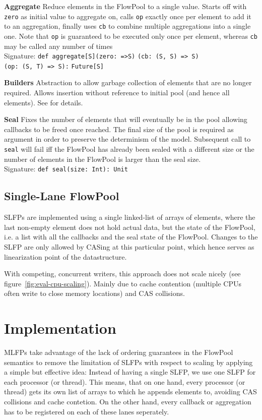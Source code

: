 \documentclass[runningheads,a4paper,fleqn]{llncs}
\begin{document}
\textbf{Aggregate} Reduce elements in the FlowPool to a single
value. Starts off with \verb+zero+ as initial value to aggregate on,
calls \verb+op+ exactly once per element to add it to an aggregation,
finally uses \verb+cb+ to combine multiple aggregations into a single
one. Note that \verb+op+ is guaranteed to be executed only once per
element, whereas \verb+cb+ may be called any number of times\\
Signature: \verb+def aggregate[S]+\verb+(zero: =>S)+
\verb+(cb: (S, S) => S)+\\
\verb+(op: (S, T) => S):+ \verb+Future[S]+

\textbf{Builders} Abstraction to allow garbage collection of elements
that are no longer required. Allows insertion without reference to
initial pool (and hence all elements). See \cite{FP12} for details.

\textbf{Seal} Fixes the number of elements that will eventually be in
the pool allowing callbacks to be freed once reached. The final size
of the pool is required as argument in order to preserve the
determinism of the model. Subsequent call to \verb+seal+ will fail iff
the FlowPool has already been sealed with a different size or the
number of elements in the FlowPool is larger than the seal size.\\
Signature: \verb+def seal(size: Int): Unit+

\subsection{Single-Lane FlowPool}
SLFPs are implemented using a single linked-list of arrays of
elements, where the last non-empty element does not hold actual data,
but the state of the FlowPool, i.e. a list with all the callbacks and
the seal state of the FlowPool. Changes to the SLFP are only allowed
by CASing at this particular point, which hence serves as
linearization point of the datastructure.

With competing, concurrent writers, this approach does not scale
nicely (see figure~\ref{fig:eval-cpu-scaling}). Mainly due to cache
contention (multiple CPUs often write to close memory locations) and
CAS collisions.

\section{Implementation}
MLFPs take advantage of the lack of ordering guarantees in the
FlowPool semantics to remove the limitation of SLFPs with respect to
scaling by applying a simple but effective idea: Instead of having a
single SLFP, we use one SLFP for each processor (or thread). This
means, that on one hand, every processor (or thread) gets its own list
of arrays to which he appends elements to, avoiding CAS collisions and
cache contetion. On the other hand, every callback or aggregation has
to be registered on each of these lanes seperately.
\end{document}
